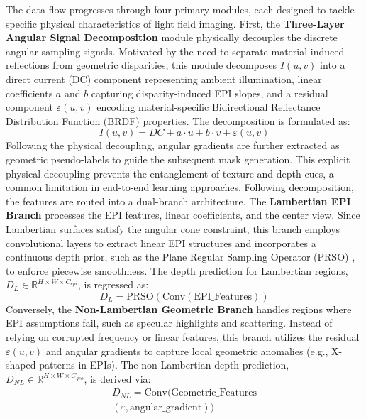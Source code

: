 \documentclass[lettersize,journal]{IEEEtran}
\begin{document}
The data flow progresses through four primary modules, each designed to tackle specific physical characteristics of light field imaging. First, the \textbf{Three-Layer Angular Signal Decomposition} module physically decouples the discrete angular sampling signals. Motivated by the need to separate material-induced reflections from geometric disparities, this module decomposes $I(u,v)$ into a direct current (DC) component representing ambient illumination, linear coefficients $a$ and $b$ capturing disparity-induced EPI slopes, and a residual component $\varepsilon(u,v)$ encoding material-specific Bidirectional Reflectance Distribution Function (BRDF) \cite{realtime} properties. The decomposition is formulated as:
\begin{equation}
I(u,v) = DC + a \cdot u + b \cdot v + \varepsilon(u,v)
\end{equation}
Following the physical decoupling, angular gradients are further extracted as geometric pseudo-labels to guide the subsequent mask generation. This explicit physical decoupling prevents the entanglement of texture and depth cues, a common limitation in end-to-end learning approaches. Following decomposition, the features are routed into a dual-branch architecture. The \textbf{Lambertian EPI Branch} processes the EPI features, linear coefficients, and the center view. Since Lambertian surfaces satisfy the angular cone constraint, this branch employs convolutional layers to extract linear EPI structures and incorporates a continuous depth prior, such as the Plane Regular Sampling Operator (PRSO) \cite{realtime}, to enforce piecewise smoothness. The depth prediction for Lambertian regions, $D_L \in \mathbb{R}^{H \times W \times C_{epi}}$, is regressed as:
\begin{equation}
D_L = \text{PRSO}(\text{Conv}(\text{EPI\_Features}))
\end{equation}
Conversely, the \textbf{Non-Lambertian Geometric Branch} handles regions where EPI assumptions fail, such as specular highlights and scattering. Instead of relying on corrupted frequency or linear features, this branch utilizes the residual $\varepsilon(u,v)$ and angular gradients to capture local geometric anomalies (e.g., X-shaped patterns in EPIs). The non-Lambertian depth prediction, $D_{NL} \in \mathbb{R}^{H \times W \times C_{geo}}$, is derived via:
\begin{multline}
D_{NL} = \text{Conv}(\text{Geometric\_Features} \\
(\varepsilon, \text{angular\_gradient}))
\end{multline}
\end{document}

